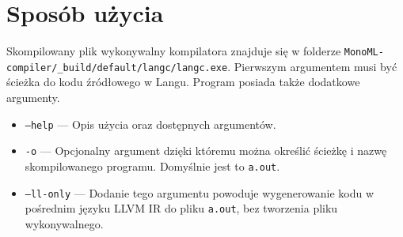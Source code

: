 \documentclass[declaration,shortabstract]{iithesis}
\begin{document}











\section{Sposób użycia}
Skompilowany plik wykonywalny kompilatora znajduje się w folderze \newline
\texttt{MonoML-compiler/\_build/default/langc/langc.exe}. Pierwszym argumentem 
musi być ścieżka do kodu źródłowego w Langu. Program posiada także dodatkowe 
argumenty. 

\begin{itemize}
  \item \texttt{--help} --- Opis użycia oraz dostępnych argumentów. 
  \item \texttt{-o} --- Opcjonalny argument dzięki któremu można określić 
  ścieżkę i nazwę skompilowanego programu. Domyślnie jest to \texttt{a.out}.
  \item \texttt{--ll-only} --- Dodanie tego argumentu powoduje wygenerowanie 
  kodu w pośrednim języku LLVM IR do pliku \texttt{a.out}, bez tworzenia pliku 
  wykonywalnego. 
\end{itemize}
\end{document}
